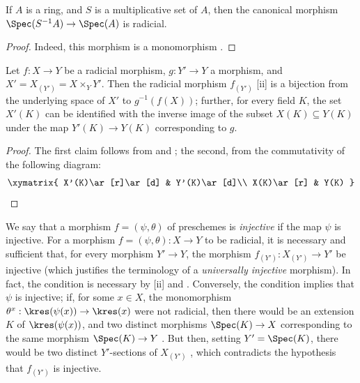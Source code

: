\begin{corollary}[3.5.9]
\label{I.3.5.9}
If $A$ is a ring, and $S$ is a multiplicative set of $A$, then the canonical morphism $\Spec(S^{-1}A)\to\Spec(A)$ is radicial.
\end{corollary}

\begin{proof}
Indeed, this morphism is a monomorphism .
\end{proof}

\begin{corollary}[3.5.10]
\label{I.3.5.10}
Let $f:X\to Y$ be a radicial morphism, $g:Y'\to Y$ a morphism, and $X'=X_{(Y')}=X\times_Y Y'$.
Then the radicial morphism $f_{(Y')}$ [ii] is a bijection from the underlying space of $X'$ to $g^{-1}(f(X))$; further, for every field $K$, the set $X'(K)$ can be identified with the inverse image of the subset $X(K)\subseteq Y(K)$ under the map $Y'(K)\to Y(K)$ corresponding to $g$.
\end{corollary}

\begin{proof}
The first claim follows from  and ; the second, from the commutativity of the following diagram:
\[
  \xymatrix{
    X'(K)\ar[r]\ar[d] &
    Y'(K)\ar[d]\\
    X(K)\ar[r] &
    Y(K)
  }
\]
\end{proof}

\begin{remark}[3.5.11]
\label{I.3.5.11}
We say that a morphism $f=(\psi,\theta)$ of preschemes is \emph{injective} if the map $\psi$ is injective.
For a morphism $f=(\psi,\theta):X\to Y$ to be radicial, it is necessary and sufficient that, for every morphism $Y'\to Y$, the morphism $f_{(Y')}:X_{(Y')}\to Y'$ be injective (which justifies the terminology of a \emph{universally injective} morphism).
In fact, the condition is necessary by [ii] and .
Conversely, the condition implies that $\psi$ is injective; if, for some $x\in X$, the monomorphism $\theta^x:\kres(\psi(x))\to\kres(x)$ were not radicial, then there would be an extension $K$ of $\kres(\psi(x))$, and two distinct morphisms $\Spec(K)\to X$ corresponding to the same morphism $\Spec(K)\to Y$ .
But then, setting $Y'=\Spec(K)$, there would be two distinct $Y'$-sections of $X_{(Y')}$ , which contradicts the hypothesis that $f_{(Y')}$ is injective.
\end{remark}

